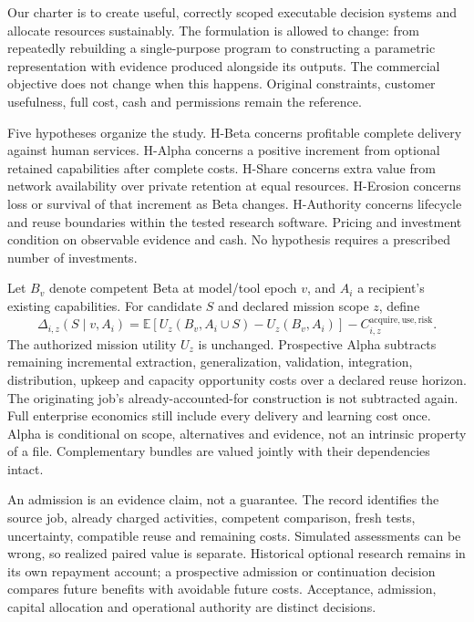 \documentclass[11pt,letterpaper]{article}
\begin{document}
Our charter is to create useful, correctly scoped executable decision systems and allocate resources sustainably. The formulation is allowed to change: from repeatedly rebuilding a single-purpose program to constructing a parametric representation with evidence produced alongside its outputs. The commercial objective does not change when this happens. Original constraints, customer usefulness, full cost, cash and permissions remain the reference.

Five hypotheses organize the study. H-Beta concerns profitable complete delivery against human services. H-Alpha concerns a positive increment from optional retained capabilities after complete costs. H-Share concerns extra value from network availability over private retention at equal resources. H-Erosion concerns loss or survival of that increment as Beta changes. H-Authority concerns lifecycle and reuse boundaries within the tested research software. Pricing and investment condition on observable evidence and cash. No hypothesis requires a prescribed number of investments.

Let $B_v$ denote competent Beta at model/tool epoch $v$, and $A_i$ a recipient's existing capabilities. For candidate $S$ and declared mission scope $z$, define
\begin{equation}
\Delta_{i,z}(S\mid v,A_i)=\mathbb{E}[U_z(B_v,A_i\cup S)-U_z(B_v,A_i)]-C^{\mathrm{acquire,use,risk}}_{i,z}.
\end{equation}
The authorized mission utility $U_z$ is unchanged. Prospective Alpha subtracts remaining incremental extraction, generalization, validation, integration, distribution, upkeep and capacity opportunity costs over a declared reuse horizon. The originating job's already-accounted-for construction is not subtracted again. Full enterprise economics still include every delivery and learning cost once. Alpha is conditional on scope, alternatives and evidence, not an intrinsic property of a file. Complementary bundles are valued jointly with their dependencies intact.

An admission is an evidence claim, not a guarantee. The record identifies the source job, already charged activities, competent comparison, fresh tests, uncertainty, compatible reuse and remaining costs. Simulated assessments can be wrong, so realized paired value is separate. Historical optional research remains in its own repayment account; a prospective admission or continuation decision compares future benefits with avoidable future costs. Acceptance, admission, capital allocation and operational authority are distinct decisions.
\end{document}
